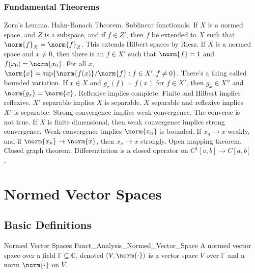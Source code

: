         \subsection{Fundamental Theorems}
            Zorn's Lemma. Hahn-Banach Theorem. Sublinear functionals.
            If $X$ is a normed space, and $Z$ is a subspace, and if
            $f\in{Z'}$, then $f$ be extended to $X$ such that
            $\norm{f}_{X}=\norm{f}_{Z}$.
            This extends Hilbert spaces by Riesz.
            If $X$ is a normed space
            and $x\ne{0}$, then there is an $f\in{X'}$ such that
            $\norm{f}=1$ and $f(x_{0})=\norm{x_{0}}$.
            For all $x$,
            $\norm{x}=\sup\{\norm{f(x)}/\norm{f}:f\in{X'},f\ne{0}\}$.
            There's a thing called bounded variation.
            If $x\in{X}$ and
            $g_{x}(f)=f(x)$ for $f\in{X'}$, then
            $g_{x}\in{X''}$ and $\norm{g_{x}}=\norm{x}$.
            Reflexive implies complete.
            Finite and Hilbert implies reflexive.
            $X'$ separable implies $X$ is separable.
            $X$ separable and reflexive implies
            $X'$ is separable.
            Strong convergence implies weak convergence.
            The converse is not true. If $X$ is finite
            dimensional, then weak convergence
            implies strong convergence. Weak convergence implies
            $\norm{x_{n}}$ is bounded. If
            $x_{n}\rightarrow{x}$ weakly, and if
            $\norm{x_{n}}\rightarrow\norm{x}$, then
            $x_{n}\rightarrow{x}$ strongly.
            Open mapping theorem.
            Closed graph theorem.
            Differentiation is a closed operator on
            $C^{1}[a,b]\rightarrow{C[a,b]}$.
\chapter{Normed Vector Spaces}
    \section{Basic Definitions}
        \begin{ldefinition}{Normed Vector Spaces}
              {Funct_Analysis_Normed_Vector_Space}
            A normed vector space over a field
            $\mathbb{F}\subseteq\mathbb{C}$, denoted
            $(V,\norm{\cdot})$ is a vector space $V$ over
            $\mathbb{F}$ and a norm $\norm{\cdot}$ on $V$.
        \end{ldefinition}

